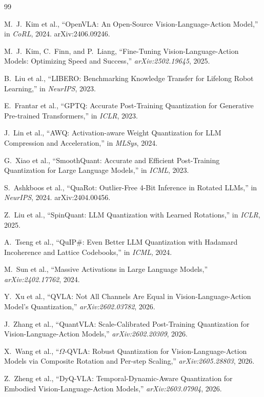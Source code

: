 \documentclass[conference]{IEEEtran}
\begin{document}
\begin{thebibliography}{99}
\small

  M.~J.~Kim et al., ``OpenVLA: An Open-Source Vision-Language-Action Model,''
  in \textit{CoRL}, 2024. arXiv:2406.09246.

  M.~J.~Kim, C.~Finn, and P.~Liang, ``Fine-Tuning Vision-Language-Action Models:
  Optimizing Speed and Success,'' \textit{arXiv:2502.19645}, 2025.

  B.~Liu et al., ``LIBERO: Benchmarking Knowledge Transfer for Lifelong Robot Learning,''
  in \textit{NeurIPS}, 2023.

  E.~Frantar et al., ``GPTQ: Accurate Post-Training Quantization for Generative
  Pre-trained Transformers,'' in \textit{ICLR}, 2023.

  J.~Lin et al., ``AWQ: Activation-aware Weight Quantization for LLM Compression and
  Acceleration,'' in \textit{MLSys}, 2024.

  G.~Xiao et al., ``SmoothQuant: Accurate and Efficient Post-Training Quantization for
  Large Language Models,'' in \textit{ICML}, 2023.

  S.~Ashkboos et al., ``QuaRot: Outlier-Free 4-Bit Inference in Rotated LLMs,''
  in \textit{NeurIPS}, 2024. arXiv:2404.00456.

  Z.~Liu et al., ``SpinQuant: LLM Quantization with Learned Rotations,''
  in \textit{ICLR}, 2025.

  A.~Tseng et al., ``QuIP\#: Even Better LLM Quantization with Hadamard Incoherence and
  Lattice Codebooks,'' in \textit{ICML}, 2024.

  M.~Sun et al., ``Massive Activations in Large Language Models,''
  \textit{arXiv:2402.17762}, 2024.

  Y.~Xu et al., ``QVLA: Not All Channels Are Equal in Vision-Language-Action Model's
  Quantization,'' \textit{arXiv:2602.03782}, 2026.

  J.~Zhang et al., ``QuantVLA: Scale-Calibrated Post-Training Quantization for
  Vision-Language-Action Models,'' \textit{arXiv:2602.20309}, 2026.

  X.~Wang et al., ``$\Omega$-QVLA: Robust Quantization for Vision-Language-Action Models
  via Composite Rotation and Per-step Scaling,'' \textit{arXiv:2605.28803}, 2026.

  Z.~Zheng et al., ``DyQ-VLA: Temporal-Dynamic-Aware Quantization for Embodied
  Vision-Language-Action Models,'' \textit{arXiv:2603.07904}, 2026.

\end{thebibliography}
\end{document}
